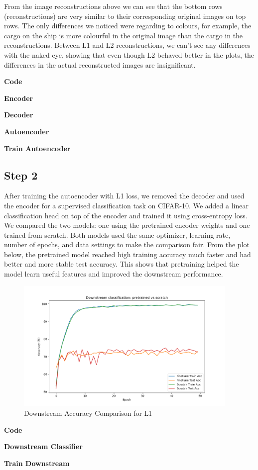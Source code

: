 From the image reconstructions above we can see that the bottom rows (reconstructions) are very similar to their corresponding original images on top rows. The only differences we noticed were regarding to colours, for example, the cargo on the ship is more colourful in the original image than the cargo in the reconstructions. Between L1 and L2 reconstructions, we can't see any differences with the naked eye, showing that even though L2 behaved better in the plots, the differences in the actual reconstructed images are insignificant.

\textbf{Code}

\textbf{Encoder}


\textbf{Decoder}


\textbf{Autoencoder}


\textbf{Train Autoencoder}


\subsection{Step 2}

After training the autoencoder with L1 loss, we removed the decoder and used the encoder for a supervised classification task on CIFAR-10. We added a linear classification head on top of the encoder and trained it using cross-entropy loss. We compared the two models: one using the pretrained encoder weights and one trained from scratch. Both models used the same optimizer, learning rate, number of epochs, and data settings to make the comparison fair. From the plot below, the pretrained model reached high training accuracy much faster and had better and more stable test accuracy. This shows that pretraining helped the model learn useful features and improved the downstream performance.

\begin{figure}[H] 
    \centering
    \includegraphics[width=0.95\textwidth]{images/ex_1/ex1_downstream_accuracy_comparison} 
    \caption{Downstream Accuracy Comparison for L1}
\end{figure}

\textbf{Code}

\textbf{Downstream Classifier}


\textbf{Train Downstream}






